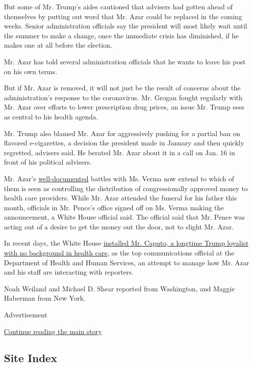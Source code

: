But some of Mr. Trump's aides cautioned that advisers had gotten ahead
of themselves by putting out word that Mr. Azar could be replaced in the
coming weeks. Senior administration officials say the president will
most likely wait until the summer to make a change, once the immediate
crisis has diminished, if he makes one at all before the election.

Mr. Azar has told several administration officials that he wants to
leave his post on his own terms.

But if Mr. Azar is removed, it will not just be the result of concerns
about the administration's response to the coronavirus. Mr. Grogan
fought regularly with Mr. Azar over efforts to lower prescription drug
prices, an issue Mr. Trump sees as central to his health agenda.

Mr. Trump also blamed Mr. Azar for aggressively pushing for a partial
ban on flavored e-cigarettes, a decision the president made in January
and then quickly regretted, advisers said. He berated Mr. Azar about it
in a call on Jan. 16 in front of his political advisers.

Mr. Azar's
\href{https://www.politico.com/news/2019/12/11/azar-verma-trump-082816}{well-documented}
battles with Ms. Verma now extend to which of them is seen as
controlling the distribution of congressionally approved money to health
care providers. While Mr. Azar attended the funeral for his father this
month, officials in Mr. Pence's office signed off on Ms. Verma making
the announcement, a White House official said. The official said that
Mr. Pence was acting out of a desire to get the money out the door, not
to slight Mr. Azar.

In recent days, the White House
\href{https://www.nytimes3xbfgragh.onion/2020/04/16/us/politics/michael-caputo-hhs.html}{installed
Mr. Caputo, a longtime Trump loyalist with no background in health
care}, as the top communications official at the Department of Health
and Human Services, an attempt to manage how Mr. Azar and his staff are
interacting with reporters.

Noah Weiland and Michael D. Shear reported from Washington, and Maggie
Haberman from New York.

Advertisement

\protect\hyperlink{after-bottom}{Continue reading the main story}

\hypertarget{site-index}{%
\subsection{Site Index}\label{site-index}}

